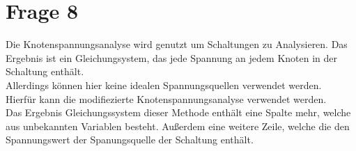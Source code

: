 \documentclass[a4paper]{scrartcl}
\begin{document}
\section*{Frage 8}
Die Knotenspannungsanalyse wird genutzt um Schaltungen zu Analysieren. Das Ergebnis ist ein Gleichungsystem, das jede Spannung an jedem Knoten in der Schaltung enthält.\\
Allerdings können hier keine idealen Spannungsquellen verwendet werden.\\
Hierfür kann die modifiezierte Knotenspannungsanalyse verwendet werden.\\
Das Ergebnis Gleichungssystem dieser Methode enthält eine Spalte mehr, welche aus unbekannten Variablen besteht. Außerdem eine weitere Zeile, welche die den Spannungswert der Spanungsquelle der Schaltung enthält.
\end{document}
